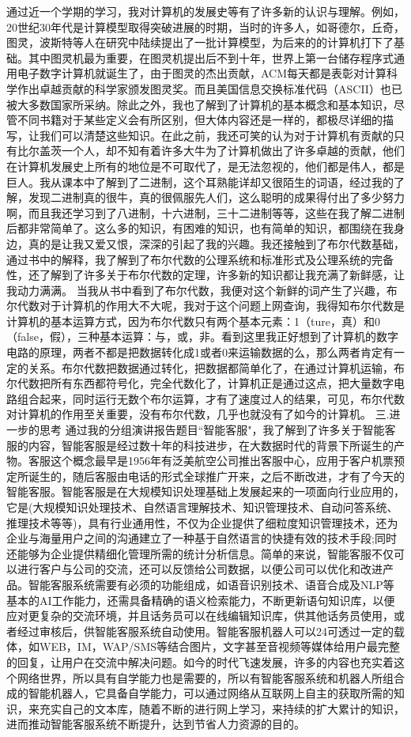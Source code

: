     通过近一个学期的学习，我对计算机的发展史等有了许多新的认识与理解。例如，20世纪30年代是计算模型取得突破进展的时期，当时的许多人，如哥德尔，丘奇，图灵，波斯特等人在研究中陆续提出了一批计算模型，为后来的的计算机打下了基础。其中图灵机最为重要，在图灵机提出后不到十年，世界上第一台储存程序式通用电子数字计算机就诞生了，由于图灵的杰出贡献，ACM每天都是表彰对计算科学作出卓越贡献的科学家颁发图灵奖。而且美国信息交换标准代码（ASCII）也已被大多数国家所采纳。除此之外，我也了解到了计算机的基本概念和基本知识，尽管不同书籍对于某些定义会有所区别，但大体内容还是一样的，都极尽详细的描写，让我们可以清楚这些知识。在此之前，我还可笑的认为对于计算机有贡献的只有比尔盖茨一个人，却不知有着许多大牛为了计算机做出了许多卓越的贡献，他们在计算机发展史上所有的地位是不可取代了，是无法忽视的，他们都是伟人，都是巨人。我从课本中了解到了二进制，这个耳熟能详却又很陌生的词语，经过我的了解，发现二进制真的很牛，真的很佩服先人们，这么聪明的成果得付出了多少努力啊，而且我还学习到了八进制，十六进制，三十二进制等等，这些在我了解二进制后都非常简单了。这么多的知识，有困难的知识，也有简单的知识，都围绕在我身边，真的是让我又爱又恨，深深的引起了我的兴趣。我还接触到了布尔代数基础，通过书中的解释，我了解到了布尔代数的公理系统和标准形式及公理系统的完备性，还了解到了许多关于布尔代数的定理，许多新的知识都让我充满了新鲜感，让我动力满满。   
    当我从书中看到了布尔代数，我便对这个新鲜的词产生了兴趣，布尔代数对于计算机的作用大不大呢，我对于这个问题上网查询，我得知布尔代数是计算机的基本运算方式，因为布尔代数只有两个基本元素：1（ture，真）和0（false，假），三种基本运算：与，或，非。看到这里我正好想到了计算机的数字电路的原理，两者不都是把数据转化成1或者0来运输数据的么，那么两者肯定有一定的关系。布尔代数把数据通过转化，把数据都简单化了，在通过计算机运输，布尔代数把所有东西都符号化，完全代数化了，计算机正是通过这点，把大量数字电路组合起来，同时运行无数个布尔运算，才有了速度过人的结果，可见，布尔代数对计算机的作用至关重要，没有布尔代数，几乎也就没有了如今的计算机。
   三.进一步的思考
    通过我的分组演讲报告题目“智能客服"，我了解到了许多关于智能客服的内容，智能客服是经过数十年的科技进步，在大数据时代的背景下所诞生的产物。客服这个概念最早是1956年有泛美航空公司推出客服中心，应用于客户机票预定所诞生的，随后客服由电话的形式全球推广开来，之后不断改进，才有了今天的智能客服。智能客服是在大规模知识处理基础上发展起来的一项面向行业应用的，它是(大规模知识处理技术、自然语言理解技术、知识管理技术、自动问答系统、推理技术等等)，具有行业通用性，不仅为企业提供了细粒度知识管理技术，还为企业与海量用户之间的沟通建立了一种基于自然语言的快捷有效的技术手段;同时还能够为企业提供精细化管理所需的统计分析信息。简单的来说，智能客服不仅可以进行客户与公司的交流，还可以反馈给公司数据，以便公司可以优化和改进产品。智能客服系统需要有必须的功能组成，如语音识别技术、语音合成及NLP等基本的AI工作能力，还需具备精确的语义检索能力，不断更新语句知识库，以便应对更复杂的交流环境，并且话务员可以在线编辑知识库，供其他话务员使用，或者经过审核后，供智能客服系统自动使用。智能客服机器人可以24可透过一定的载体，如WEB，IM，WAP/SMS等结合图片，文字甚至音视频等媒体给用户最完整的回复，让用户在交流中解决问题。如今的时代飞速发展，许多的内容也充实着这个网络世界，所以具有自学能力也是需要的，所以有智能客服系统和机器人所组合成的智能机器人，它具备自学能力，可以通过网络从互联网上自主的获取所需的知识，来充实自己的文本库，随着不断的进行网上学习，来持续的扩大累计的知识，进而推动智能客服系统不断提升，达到节省人力资源的目的。
